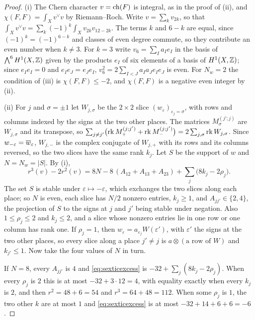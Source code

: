 \begin{proof}
(i) The Chern character $v=\operatorname{ch}(F)$ is integral, as in the proof of
(ii), and $\chi(F,F)=\int_{X}v^{\vee}v$ by
Riemann--Roch. Write $v=\sum_{k}v_{2k}$, so that
$\int_{X}v^{\vee}v=\sum_{k}(-1)^{k}\int_{X}v_{2k}v_{12-2k}$. The terms $k$ and
$6-k$ are equal, since $(-1)^{k}=(-1)^{6-k}$ and classes of even degree
commute, so they contribute an even number when $k\ne3$. For $k=3$ write
$v_{6}=\sum_{I}a_{I}e_{I}$ in the basis of $\bigwedge^{6}H^{1}(X,\mathbb{Z})$ given
by the products $e_{I}$ of six elements of a basis of $H^{1}(X,\mathbb{Z})$; since
$e_{I}e_{I}=0$ and $e_{I}e_{J}=e_{J}e_{I}$, $v_{6}^{2}=2\sum_{I<J}a_{I}a_{J}
e_{I}e_{J}$ is even. For $N_{w}=2$ the condition of
(iii) is $\chi(F,F)\le-2$, and $\chi(F,F)$ is a
negative even integer by (ii).

(ii) For $j$ and $\sigma=\pm1$ let $W_{j,\sigma}$ be the $2\times2$ slice
$(w_{\varepsilon})_{\varepsilon_{j}=\sigma}$, with rows and columns indexed by
the signs at the two other places. The matrices $M^{(j';j)}_{\sigma}$ are
$W_{j,\sigma}$ and its transpose, so
$\sum_{j\ne j'}\bigl(\operatorname{rk} M^{(j;j')}_{+}+\operatorname{rk} M^{(j;j')}_{-}\bigr)
=2\sum_{j,\sigma}\operatorname{rk} W_{j,\sigma}$. Since $w_{-\varepsilon}=\overline{w}_{\varepsilon}$,
$W_{j,-}$ is the complex conjugate of $W_{j,+}$ with its rows and its columns
reversed, so the two slices have the same rank $k_{j}$. Let $S$ be the support
of $w$ and $N=N_{w}=|S|$. By (i),
\begin{equation}\label{eq:sexticexcess}
  r^{3}(v)-2r^{2}(v)=8N-8\,(A_{12}+A_{13}+A_{23})
  +\sum_{j}\bigl(8k_{j}-2\rho_{j}\bigr).
\end{equation}
The set $S$ is stable under $\varepsilon\mapsto-\varepsilon$, which exchanges
the two slices along each place; so $N$ is even, each slice has $N/2$ nonzero
entries, $k_{j}\ge1$, and $A_{jj'}\in\{2,4\}$, the projection of $S$ to the
signs at $j$ and $j'$ being stable under negation. Also $1\le\rho_{j}\le2$ and
$k_{j}\le2$, and a slice whose nonzero entries lie in one row or one column
has rank one. If $\rho_{j}=1$, then $w_{\varepsilon}=a_{\varepsilon_{j}}
W(\varepsilon')$, with $\varepsilon'$ the signs at the two other places, so
every slice along a place $j'\ne j$ is $a\otimes(\text{a row of }W)$ and
$k_{j'}\le1$. Now take the four values of $N$ in turn.

If $N=8$, every $A_{jj'}$ is $4$ and \eqref{eq:sexticexcess} is
$-32+\sum_{j}(8k_{j}-2\rho_{j})$. When every $\rho_{j}$ is $2$ this is at most
$-32+3\cdot12=4$, with equality exactly when every $k_{j}$ is $2$, and then
$r^{2}=48+6=54$ and $r^{3}=64+48=112$. When some $\rho_{j}$ is $1$, the two
other $k$ are at most $1$ and \eqref{eq:sexticexcess} is at most
$-32+14+6+6=-6$.


\end{proof}
